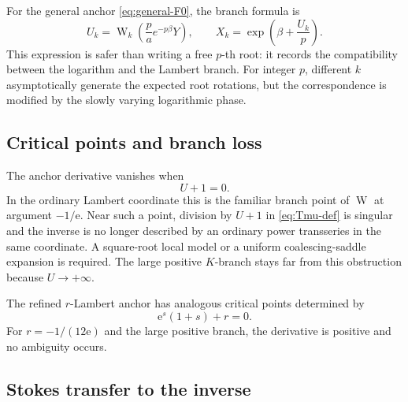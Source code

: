 \documentclass[11pt,oneside]{article}
\theoremstyle{plain}
\theoremstyle{definition}
\theoremstyle{remark}
\newcommand{\W}{\operatorname{W}}
\newcommand{\e}{\mathrm{e}}
\begin{document}
For the general anchor \eqref{eq:general-F0}, the branch formula is
\begin{equation}
 U_k=\W_k\!\left(\frac{p}{a}e^{-p\beta}Y\right),
 \qquad
 X_k=\exp\!\left(\beta+\frac{U_k}{p}\right).
 \label{eq:general-complex-anchor}
\end{equation}
This expression is safer than writing a free \(p\)-th root: it records the
compatibility between the logarithm and the Lambert branch.  For integer
\(p\), different \(k\) asymptotically generate the expected root rotations,
but the correspondence is modified by the slowly varying logarithmic phase.

\subsection{Critical points and branch loss}

The anchor derivative vanishes when
\begin{equation}
 U+1=0.
 \label{eq:anchor-critical}
\end{equation}
In the ordinary Lambert coordinate this is the familiar branch point of
\(\W\) at argument \(-1/\e\).  Near such a point, division by \(U+1\) in
\eqref{eq:Tmu-def} is singular and the inverse is no longer described by an
ordinary power transseries in the same coordinate.  A square-root local model
or a uniform coalescing-saddle expansion is required.  The large positive
\(K\)-branch stays far from this obstruction because \(U\to+\infty\).

The refined \(r\)-Lambert anchor has analogous critical points determined by
\begin{equation}
 \e^s(1+s)+r=0.
 \label{eq:rW-critical}
\end{equation}
For \(r=-1/(12\e)\) and the large positive branch, the derivative is positive
and no ambiguity occurs.

\subsection{Stokes transfer to the inverse}
\end{document}
